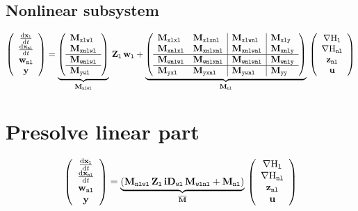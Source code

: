 \documentclass[10pt,a4paper]{article}
\begin{document}
\subsection{Nonlinear subsystem}
%
\begin{equation}
\left(\begin{array}{c}
\D{\vxl}{t}\\
\D{\vxnl}{t}\\
\vwnl\\
\vy
\end{array}\right)
 =\underbrace{\left(\begin{array}{l}
\M{xlwl}  \\ 
\M{xnlwl} \\ \hline
\M{wnlwl} \\ \hline
\M{ywl} 
\end{array}\right)}_{\M{nlwl}}
\,\mat{Z}_{\lab l}\,\vwl 
+
\underbrace{\left(\begin{array}{ll|l|l}
\M{xlxl}&\M{xlxnl}&\M{xlwnl} & \M{xly}\\ 
\M{xnlxl}&\M{xnlxnl}&  \M{xnlwnl} & \M{xnly}\\ \hline
\M{wnlwl}& \M{wnlxnl}& \M{wnlwnl} & \M{wnly}\\ \hline
\M{yxl} &\M{yxnl}& \M{ywnl} &\M{yy}
\end{array}\right)}_{\M{nl}}
\,
\left(\begin{array}{c}
\nabla\Hl\\
\nabla\Hnl\\
\vznl\\
\vu
\end{array}\right)
\end{equation}
%
\section{Presolve linear part}
%
\begin{equation}
\left(\begin{array}{c}
\D{\vxl}{t}\\
\D{\vxnl}{t}\\
\vwnl\\
\vy
\end{array}\right)
 =\underbrace{\left(\M{nlwl}
\,\mat{Z}_{\lab l}\,\mat{iD}_{\lab {wl}}\,\M{wlnl}
+
\M{nl}\right)}_{\overline {\mat M}}
\,
\left(\begin{array}{c}
\nabla\Hl\\
\nabla\Hnl\\
\vznl\\
\vu
\end{array}\right)
\end{equation}
%
\end{document}
